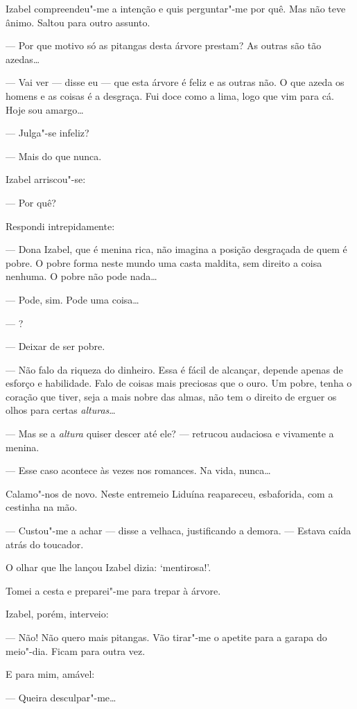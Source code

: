 Izabel compreendeu"-me a intenção e quis perguntar"-me por quê. Mas não
teve ânimo. Saltou para outro assunto.

--- Por que motivo só as pitangas desta árvore prestam? As outras são
tão azedas\ldots{}

--- Vai ver --- disse eu --- que esta árvore é feliz e as outras não. O
que azeda os homens e as coisas é a desgraça. Fui doce como a lima, logo
que vim para cá. Hoje sou amargo\ldots{}

--- Julga"-se infeliz?

--- Mais do que nunca.

Izabel arriscou"-se:

--- Por quê?

Respondi intrepidamente:

--- Dona Izabel, que é menina rica, não imagina a posição desgraçada de
quem é pobre. O pobre forma neste mundo uma casta maldita, sem direito a
coisa nenhuma. O pobre não pode nada\ldots{}

--- Pode, sim. Pode uma coisa\ldots{}

--- ?

--- Deixar de ser pobre.

--- Não falo da riqueza do dinheiro. Essa é fácil de alcançar, depende
apenas de esforço e habilidade. Falo de coisas mais preciosas que o
ouro. Um pobre, tenha o coração que tiver, seja a mais nobre das almas,
não tem o direito de erguer os olhos para certas \emph{alturas}\ldots{}

--- Mas se a \emph{altura} quiser descer até ele? --- retrucou audaciosa
e vivamente a menina.

--- Esse caso acontece às vezes nos romances. Na vida, nunca\ldots{}

Calamo"-nos de novo. Neste entremeio Liduína reapareceu, esbaforida, com
a cestinha na mão.

--- Custou"-me a achar --- disse a velhaca, justificando a demora. ---
Estava caída atrás do toucador.

O olhar que lhe lançou Izabel dizia: `mentirosa!'.

Tomei a cesta e preparei"-me para trepar à árvore.

Izabel, porém, interveio:

--- Não! Não quero mais pitangas. Vão tirar"-me o apetite para a garapa
do meio"-dia. Ficam para outra vez.

E para mim, amável:

--- Queira desculpar"-me\ldots{}

